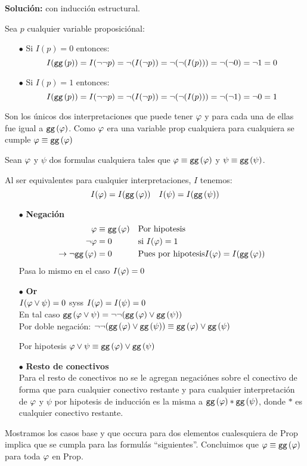 \documentclass[11pt,letterpaper]{article}
\begin{document}
\begin{enumerate}
\begin{enumerate}
    {\bf Solución:} con inducción estructural.

    Sea $p$ cualquier variable proposiciónal:
    \begin{itemize}
    \item[$\bullet$] Si $I(p) = 0$ entonces:
      $$I({\tt gg\,}(p)) = I(\neg\neg p) = \neg(I(\neg p)) = \neg(\neg(I( p))) =
      \neg(\neg 0) = \neg 1 = 0$$
    \item[$\bullet$] Si $I(p) = 1$ entonces:
      $$I({\tt gg\,}( p)) = I(\neg\neg p) = \neg(I(\neg p)) = \neg(\neg(I(p))) =
      \neg(\neg 1) = \neg 0 = 1$$
    \end{itemize}
    Son los únicos dos interpretaciones que puede tener $\varphi$ y para cada una
    de ellas fue igual a ${\tt gg\,}(\varphi)$. Como $\varphi$ era una variable
    prop cualquiera para cualquiera se cumple $\varphi\equiv{\tt gg\,}(\varphi)$

    \hfill\break
    Sean $\varphi$ y $\psi$ dos formulas cualquiera tales que
    $\varphi \equiv {\tt gg\,}(\varphi)$ y $\psi \equiv {\tt gg\,}(\psi)$.

    Al ser equivalentes para cualquier interpretaciones, $I$ tenemos:
    $$I(\vp) = I(\ggf(\vp)) \ \ \ I(\psi) = I(\ggf(\psi))$$
    \begin{itemize}
    \item[$\bullet$] {\bf Negación}\\
      \begin{align*}
        \varphi &\equiv {\tt gg\,}(\varphi) & &\text{Por hipotesis}\\
        \neg\varphi &= 0 & &\text{si } I(\varphi) = 1 \\
        \rightarrow \neg{\tt gg\,}(\varphi) &= 0 & & \text{Pues por hipotesis} I(\varphi) =
        I({\tt gg\,}(\varphi))\\
      \end{align*}
      Pasa lo mismo en el caso $I(\varphi) = 0$
      
    \item[$\bullet$] {\bf Or}\\
      $I(\varphi\lor\psi) = 0$ syss $I(\varphi) = I(\psi) = 0$ \\
      En tal caso ${\tt gg\,}(\varphi\lor\psi) = \neg\neg({\tt gg\,}(\varphi)\lor{\tt gg\,}(\psi))$ \\
      Por doble negación: $\neg\neg({\tt gg\,}(\varphi)\lor{\tt gg\,}(\psi))
      \equiv {\tt gg\,}(\varphi)\lor{\tt gg\,}(\psi)$

      Por hipotesis $\varphi\lor\psi\equiv {\tt gg\,}(\varphi)\lor{\tt gg\,}(\psi)$
    \item[$\bullet$] {\bf Resto de conectivos}\\
      Para el resto de conectivos no se le agregan negaciónes sobre el conectivo de forma que
      para cualquier conectivo restante y para cualquier interpretación de $\varphi$ y $\psi$ por
      hipotesis de inducción es la misma a ${\tt gg\,}(\varphi)*{\tt gg\,}(\psi)$, donde $*$ es cualquier conectivo
      restante.
    \end{itemize}
    Mostramos los casos base y que occura para dos elementos cualesquiera de Prop implica que
    se cumpla para las formulás ``siguientes''. Concluimos que $\varphi\equiv{\tt gg\,}(\varphi)$ para toda $\varphi$ en Prop.
  \end{enumerate}
  

\end{enumerate}
\end{document}
